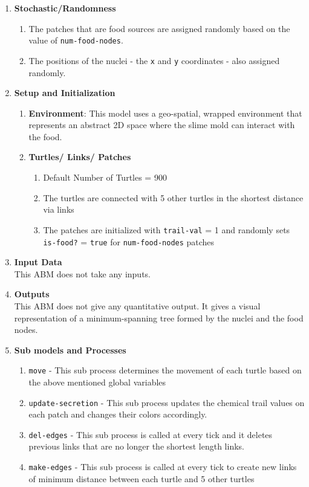 \documentclass[a4paper, 12pt]{article}
\begin{document}
\begin{enumerate}
   
    \item \textbf{Stochastic/Randomness } 
    \begin{enumerate}
        \item The patches that are food sources are assigned randomly based on the value of \texttt{num-food-nodes}.
        \item The positions of the nuclei - the \texttt{x} and \texttt{y} coordinates - also assigned randomly.
    \end{enumerate}
    \item \textbf{Setup and Initialization}
    \begin{enumerate}
        \item \textbf{Environment}:  This model uses a geo-spatial, wrapped environment that represents an abstract 2D space where the slime mold can interact with the food.
        \item \textbf{Turtles/ Links/ Patches}
        \begin{enumerate}
            \item Default Number of Turtles = 900
            \item The turtles are connected with 5 other turtles in the shortest distance via links
            \item The patches are initialized with \texttt{trail-val} = 1 and randomly sets \texttt{is-food?} = \texttt{true} for \texttt{num-food-nodes} patches 
        \end{enumerate}
    \end{enumerate}
   
    \item \textbf{Input Data} \\
    This ABM does not take any inputs. 
    
    \item \textbf{Outputs} \\
    This ABM does not give any quantitative output. It gives a visual representation of a minimum-spanning tree formed by the nuclei and the food nodes. 
    \item \textbf{Sub models and Processes}
    \begin{enumerate}
    \item \texttt{move} - This sub process determines the movement of each turtle based on the above mentioned global variables
    \item \texttt{update-secretion} - This sub process updates the chemical trail values on each patch and changes their colors accordingly.
        \item \texttt{del-edges} - This sub process is called at every tick and it deletes previous links that are no longer the shortest length links.
        \item \texttt{make-edges} - This sub process is called at every tick to create new links of minimum distance between each turtle and 5 other turtles
    \end{enumerate}
    \end{enumerate}
   \newpage
\end{document}
